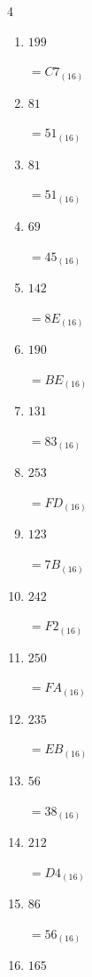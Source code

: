 \begin{multicols}{4}
\begin{enumerate}
        $=FD_{(16)}$

  \item $199$

        $=C7_{(16)}$

  \item $81$

        $=51_{(16)}$

  \item $81$

        $=51_{(16)}$

  \item $69$

        $=45_{(16)}$

  \item $142$

        $=8E_{(16)}$

  \item $190$

        $=BE_{(16)}$

  \item $131$

        $=83_{(16)}$

\columnbreak %

\resetques

  \item $253$

        $=FD_{(16)}$

  \item $123$

        $=7B_{(16)}$

  \item $242$

        $=F2_{(16)}$

  \item $250$

        $=FA_{(16)}$

  \item $235$

        $=EB_{(16)}$

  \item $56$

        $=38_{(16)}$

  \item $212$

        $=D4_{(16)}$

  \item $86$

        $=56_{(16)}$

  \item $165$


\end{enumerate}
\end{multicols}

